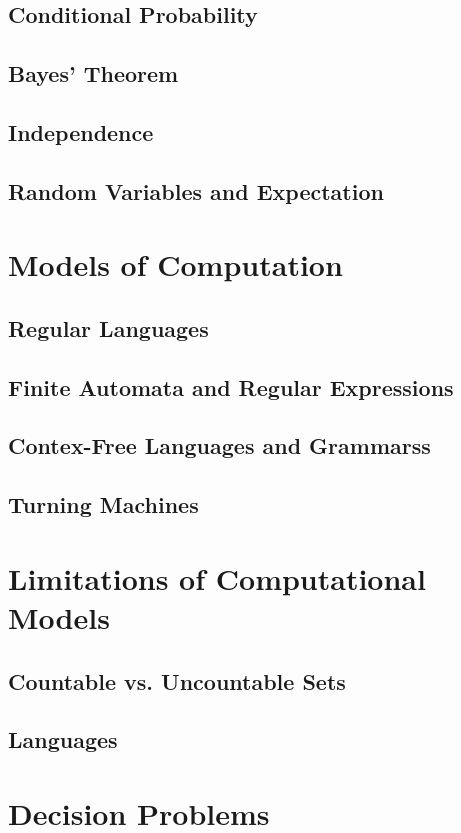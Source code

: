 \documentclass[a4paper]{article}
\begin{document}
\begin{multicols}{2}
	\subsection{Conditional Probability}
	\subsection{Bayes' Theorem}
	\subsection{Independence}
	\subsection{Random Variables and Expectation}

	\section{Models of Computation}
	\subsection{Regular Languages}
	\subsection{Finite Automata and Regular Expressions}
	\subsection{Contex-Free Languages and Grammarss}
	\subsection{Turning Machines}

	\section{Limitations of Computational Models}
	\subsection{Countable vs. Uncountable Sets}
	\subsection{Languages}

	\section{Decision Problems}


\end{multicols}
\end{document}
